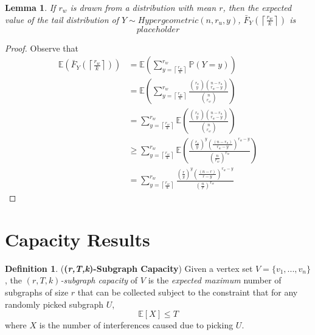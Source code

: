 \documentclass[10pt]{extarticle}
\newcommand{\E}{\mathbb{E}}
\newtheorem{lemma}[theorem]{Lemma}
\theoremstyle{definition}
\newtheorem{definition}[theorem]{Definition}
\begin{document}
\begin{lemma}
    \label{lemma:tail-expectation}
        If $r_w$ is drawn from a distribution with mean $r$, then the expected value of the tail distribution of $Y \sim Hypergeometric(n, r_u, y)$, $\bar{F}_Y\left(\left\lceil \frac{r_w}{k} \right\rceil\right)$ is $$placeholder$$
    \end{lemma}
    \begin{proof}
        Observe that
        \begin{equation}
        \begin{split}
            \mathbb{E} \left( \bar{F}_Y\left(\left\lceil \frac{r_w}{k} \right\rceil\right) \right) &=
            \mathbb{E} \left( \sum_{y = \left\lceil \frac{r_w}{k} \right\rceil}^{r_w} \mathbb{P}(Y=y) \right) \\ &= \mathbb{E}  \left( \sum_{y = \left\lceil \frac{r_w}{k} \right\rceil}^{r_w} \frac{\binom{r_u}{y} \binom{n-r_u}{r_w-y}}{\binom{n}{r_w}} \right) \\ &=  \sum_{y = \left\lceil \frac{r_w}{k} \right\rceil}^{r_w} \mathbb{E} \left(\frac{\binom{r_u}{y} \binom{n-r_u}{r_w-y}}{\binom{n}{r_w}}  \right) \\ &\ge \sum_{y = \left\lceil \frac{r_w}{k} \right\rceil}^{r_w} \mathbb{E} 
            \left(
                \frac
                {
                    \left(\frac{r_u}{y}\right)^{y} \left(\frac{(n-r_u)}{r_w - y}\right)^{r_w-y}
                }
                {
                    \left(\frac{n}{r_w}\right)^{r_w}
                }  
            \right) \\ &= 
            \sum_{y = \left\lceil \frac{r_w}{k} \right\rceil}^{r_w}
                \frac
                {
                    \left(\frac{r}{y}\right)^{y} \left(\frac{(n-r)}{r - y}\right)^{r_w-y}
                }
                {
                    \left(\frac{n}{r}\right)^{r_w}
                }  
        \end{split}
    \end{equation}
    \end{proof}

\section{Capacity Results}

\begin{definition} (\textbf{(\textit{r,T,k})-Subgraph Capacity}) Given a vertex set $V = \{v_1,...,v_n\}$, the \textit{$(r,T,k)$-subgraph capacity} of $V$ is the \textit{expected maximum} number of subgraphs of size $r$ that can be collected subject to the constraint that for any randomly picked subgraph $U$, 
\begin{equation}
\label{equ:cap-bound}
    \E[X] \le T
\end{equation}
where $X$ is the number of interferences caused due to picking $U$. 
\end{definition}
\end{document}
